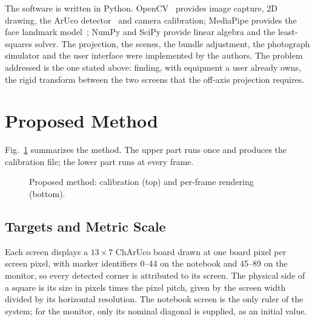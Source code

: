 \documentclass[english,hidelinks]{sbrt}
\begin{document}
The software is written in Python. OpenCV~\cite{bradski2000opencv} provides image capture, 2D drawing, the ArUco detector~\cite{garrido2014automatic} and camera calibration; MediaPipe provides the face landmark model~\cite{grishchenko2020attention}; NumPy and SciPy provide linear algebra and the least-squares solver. The projection, the scenes, the bundle adjustment, the photograph simulator and the user interface were implemented by the authors. The problem addressed is the one stated above: finding, with equipment a user already owns, the rigid transform between the two screens that the off-axis projection requires.

\section{Proposed Method}
\label{sec:III}

Fig.~\ref{fig:pipeline} summarizes the method. The upper part runs once and produces the calibration file; the lower part runs at every frame.

\begin{figure}[t]
\centering
{}
\caption{Proposed method: calibration (top) and per-frame rendering (bottom).}
\label{fig:pipeline}
\end{figure}

\subsection{Targets and Metric Scale}
Each screen displays a $13\times7$ ChArUco board drawn at one board pixel per screen pixel, with marker identifiers 0--44 on the notebook and 45--89 on the monitor, so every detected corner is attributed to its screen. The physical side of a square is its size in pixels times the pixel pitch, given by the screen width divided by its horizontal resolution. The notebook screen is the only ruler of the system; for the monitor, only its nominal diagonal is supplied, as an initial value.
\end{document}
